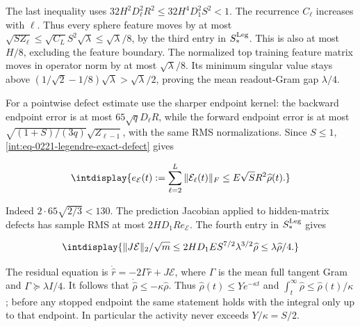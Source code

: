 
The last inequality uses \(32H^2D_\ell^2R^2\le32H^4D_1^2S^2<1\). The recurrence \(C_\ell\) increases with \(\ell\). Thus every sphere feature moves by at most \(\sqrt{SZ_\ell}\le\sqrt{C_L}S^2\sqrt\lambda\le\sqrt\lambda/8\), by the third entry in \(S_*^{\rm Leg}\). This is also at most \(H/8\), excluding the feature boundary. The normalized top training feature matrix moves in operator norm by at most \(\sqrt\lambda/8\). Its minimum singular value stays above \((1/\sqrt2-1/8)\sqrt\lambda>\sqrt\lambda/2\), proving the mean readout-Gram gap \(\lambda/4\).



For a pointwise defect estimate use the sharper endpoint kernel: the backward endpoint error is at most \(65\sqrt qD_\ell R\), while the forward endpoint error is at most \(\sqrt{(1+S)/(3q)}\sqrt{Z_{\ell-1}}\), with the same RMS normalizations. Since \(S\le1\), \eqref{int:eq-0221-legendre-exact-defect} gives


\begingroup\renewcommand{\theHequation}{intdisplay.524}
\begin{equation}
\intdisplay{
e_{\mathcal E}(t):=\sum_{\ell=2}^L\|\mathcal E_\ell(t)\|_F
\le E\sqrt S R^2\widehat\rho(t).
}
\label{int:eq-0224-legendre-pointwise-defect}
\end{equation}
\endgroup


Indeed \(2\cdot65\sqrt{2/3}<130\). The prediction Jacobian applied to hidden-matrix defects has sample RMS at most \(2HD_1R e_{\mathcal E}\). The fourth entry in \(S_*^{\rm Leg}\) gives


\begingroup\renewcommand{\theHequation}{intdisplay.525}
\begin{equation*}
\intdisplay{
\|J\mathcal E\|_2/\sqrt m
\le2HD_1E S^{7/2}\lambda^{3/2}\widehat\rho
\le\lambda\widehat\rho/4.
}
\end{equation*}
\endgroup


The residual equation is \(\dot{\widehat r}=-2\Gamma\widehat r+J\mathcal E\), where \(\Gamma\) is the mean full tangent Gram and \(\Gamma\succeq\lambda I/4\). It follows that \(\dot{\widehat\rho}\le-\kappa\widehat\rho\). Thus \(\widehat\rho(t)\le Ye^{-\kappa t}\) and \(\int_t^\infty\widehat\rho\le\widehat\rho(t)/\kappa\); before any stopped endpoint the same statement holds with the integral only up to that endpoint. In particular the activity never exceeds \(Y/\kappa=S/2\).


